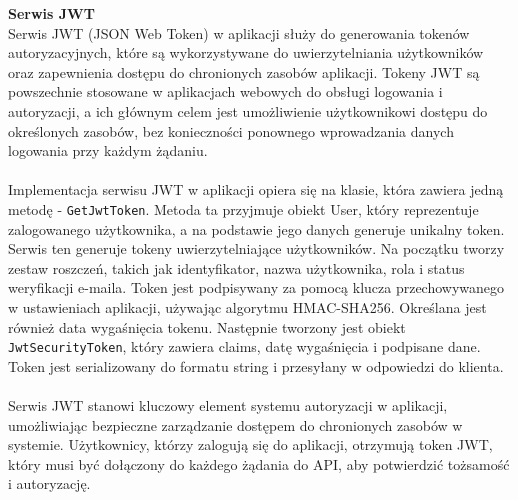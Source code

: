 \documentclass[12pt,a4paper]{article}
\begin{document}
\noindent \textbf{Serwis JWT}\\
Serwis JWT (JSON Web Token) w aplikacji służy do generowania tokenów autoryzacyjnych, które są wykorzystywane do uwierzytelniania użytkowników oraz zapewnienia dostępu do chronionych zasobów aplikacji. Tokeny JWT są powszechnie stosowane w aplikacjach webowych do obsługi logowania i autoryzacji, a ich głównym celem jest umożliwienie użytkownikowi dostępu do określonych zasobów, bez konieczności ponownego wprowadzania danych logowania przy każdym żądaniu.
\\\\
Implementacja serwisu JWT w aplikacji opiera się na klasie, która zawiera jedną metodę - \texttt{GetJwtToken}. Metoda ta przyjmuje obiekt User, który reprezentuje zalogowanego użytkownika, a na podstawie jego danych generuje unikalny token. Serwis ten generuje tokeny uwierzytelniające użytkowników. Na początku tworzy zestaw roszczeń, takich jak identyfikator, nazwa użytkownika, rola i status weryfikacji e-maila. Token jest podpisywany za pomocą klucza przechowywanego w ustawieniach aplikacji, używając algorytmu HMAC-SHA256. Określana jest również data wygaśnięcia tokenu. Następnie tworzony jest obiekt \texttt{JwtSecurityToken}, który zawiera claims, datę wygaśnięcia i podpisane dane. Token jest serializowany do formatu string i przesyłany w odpowiedzi do klienta.
\\\\
Serwis JWT stanowi kluczowy element systemu autoryzacji w aplikacji, umożliwiając bezpieczne zarządzanie dostępem do chronionych zasobów w systemie. Użytkownicy, którzy zalogują się do aplikacji, otrzymują token JWT, który musi być dołączony do każdego żądania do API, aby potwierdzić tożsamość i autoryzację.

\newpage
\end{document}
